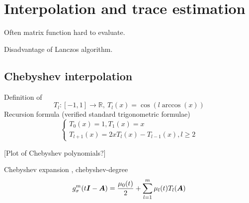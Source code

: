 \chapter{Interpolation and trace estimation}
\label{chp:2-chebyshev}

Often matrix function hard to evaluate.

Disadvantage of Lanczos algorithm.


\section{Chebyshev interpolation}
\label{sec:2-chebyshev-interpolation}

Definition of  \cite[Chapter~3]{trefethen2019chebyshev}
\begin{equation}
    T_l: [-1, 1] \to \mathbb{R},~T_l(x) = \cos(l \arccos(x))
    \label{equ:2-chebyshev-chebyshev-definition}
\end{equation}
Recursion formula (verified standard trigonometric formulae)
\begin{equation}
    \begin{cases}
        T_0(x) = 1, T_1(x) = x \\ T_{l+1}(x) = 2x T_l(x) - T_{l-1}(x), l \geq 2
    \end{cases}
    \label{equ:2-chebyshev-chebyshev-recursion}
\end{equation}

[Plot of Chebyshev polynomials?]

Chebyshev expansion \cite[Chapter~3]{trefethen2019chebyshev},
\gls{chebyshev-degree}
\begin{equation}
    g_{\sigma}^m(t\boldsymbol{I} - \boldsymbol{A}) = \frac{\mu_0(t)}{2} + \sum_{l=1}^m \mu_l(t) T_l(\boldsymbol{A})
    \label{equ:2-chebyshev-chebyshev-expansion}
\end{equation}

